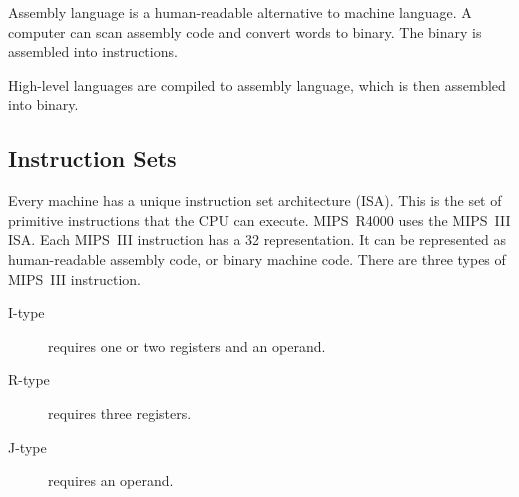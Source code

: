 Assembly language is a human-readable alternative to machine language.
A computer can scan assembly code and convert words to binary.
The binary is assembled into instructions.

High-level languages are compiled to assembly language, which is then assembled into binary.

\subsection{Instruction Sets}

Every machine has a unique instruction set architecture (ISA).
This is the set of primitive instructions that the CPU can execute.
MIPS~R4000 uses the MIPS~III ISA\@.
Each MIPS~III instruction has a \SI{32}{\bit} representation.
It can be represented as human-readable assembly code, or binary machine code.
There are three types of MIPS~III instruction.
\begin{description}
  \item[I-type] requires one or two registers and an operand.
  \item[R-type] requires three registers.
  \item[J-type] requires an operand.
\end{description}
